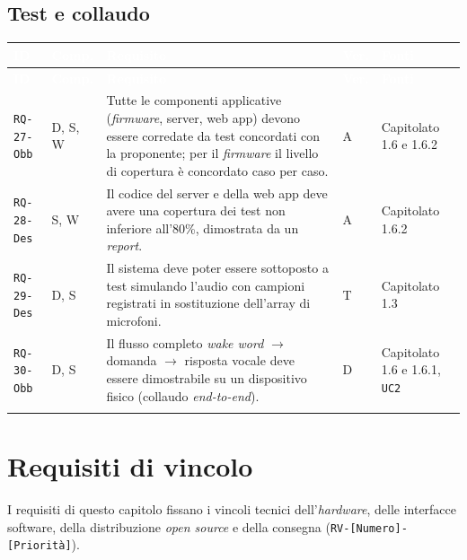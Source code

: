 \documentclass[12pt,a4paper]{article}
\newcommand{\thc}[1]{\textcolor{white}{\textbf{#1}}}
\newcommand{\rl}{\\ \arrayrulecolor{bfline}\hline}
\begin{document}
\subsection{Test e collaudo}
\begin{longtable}{>{\raggedright\arraybackslash}p{}>{\centering\arraybackslash}p{}>{\raggedright\arraybackslash}p{}>{\centering\arraybackslash}p{}>{\raggedright\arraybackslash}p{}}
\rowcolor{bfblue}\thc{ID} & \thc{Comp.} & \thc{Requisito} & \thc{Ver.} & \thc{Fonti} \\ \endfirsthead
\rowcolor{bfblue}\thc{ID} & \thc{Comp.} & \thc{Requisito} & \thc{Ver.} & \thc{Fonti} \\ \endhead
\texttt{RQ-27-Obb} & D, S, W & Tutte le componenti applicative (\emph{firmware}, server, web app) devono essere corredate da test concordati con la proponente; per il \emph{firmware} il livello di copertura è concordato caso per caso. & A & Capitolato 1.6 e 1.6.2 \rl

\texttt{RQ-28-Des} & S, W & Il codice del server e della web app deve avere una copertura dei test non inferiore all'80\%, dimostrata da un \emph{report}. & A & Capitolato 1.6.2 \rl

\texttt{RQ-29-Des} & D, S & Il sistema deve poter essere sottoposto a test simulando l'audio con campioni registrati in sostituzione dell'array di microfoni. & T & Capitolato 1.3 \rl

\texttt{RQ-30-Obb} & D, S & Il flusso completo \emph{wake word} $\rightarrow$ domanda $\rightarrow$ risposta vocale deve essere dimostrabile su un dispositivo fisico (collaudo \emph{end-to-end}). & D & Capitolato 1.6 e 1.6.1, \texttt{UC2} \rl

\end{longtable}

\section{Requisiti di vincolo}
I requisiti di questo capitolo fissano i vincoli tecnici dell'\emph{hardware}, delle interfacce software, della distribuzione \emph{open source} e della consegna (\texttt{RV-[Numero]-[Priorità]}).
\end{document}
